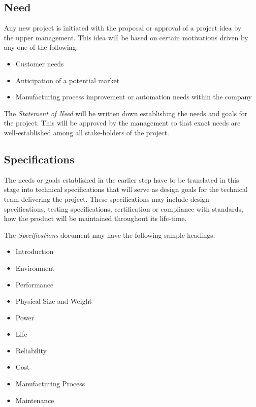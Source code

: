 \documentclass[a4paper,10pt]{article}
\begin{document}
\subsection{Need}
Any new project is initiated with the proposal or approval of a project idea by the upper management. This 
idea will be based on certain motivations driven by any one of the following:
\begin{itemize}
 \item Customer needs
 \item Anticipation of a potential market
 \item Manufacturing process improvement or automation needs within the company
\end{itemize}
The \emph{Statement of Need} will be written down establishing the needs and goals for the project. This will
be approved by the management so that exact needs are well-established among all stake-holders of the project.

\subsection{Specifications}
The needs or goals established in the earlier step have to be translated in this stage into technical specifications
that will serve as design goals for the technical team delivering the project. These specifications may include design specifications,
testing specifications, certification or compliance with standards, how the product will be maintained throughout its life-time.

The \emph{Specifications} document may have the following sample headings:
\begin{itemize}
 \item Introduction
 \item Environment
 \item Performance
 \item Physical Size and Weight
 \item Power
 \item Life
 \item Reliability
 \item Cost
 \item Manufacturing Process
 \item Maintenance
\end{itemize}
\end{document}
